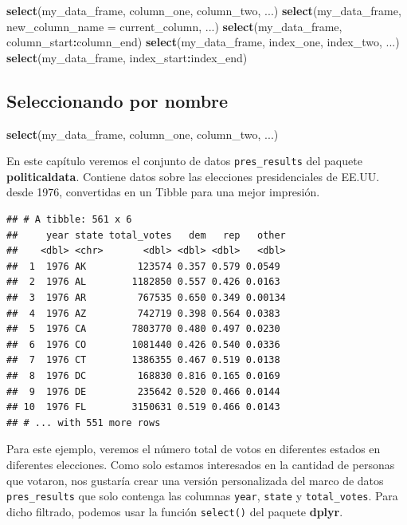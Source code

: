 \documentclass[
]{book}
\newenvironment{Shaded}{\begin{snugshade}}{\end{snugshade}}
\newcommand{\DataTypeTok}[1]{\textcolor[rgb]{0.13,0.29,0.53}{#1}}
\newcommand{\KeywordTok}[1]{\textcolor[rgb]{0.13,0.29,0.53}{\textbf{#1}}}
\newcommand{\NormalTok}[1]{#1}
\newcommand{\OperatorTok}[1]{\textcolor[rgb]{0.81,0.36,0.00}{\textbf{#1}}}
\begin{document}
\begin{Shaded}
\begin{Highlighting}[]
\KeywordTok{select}\NormalTok{(my_data_frame, column_one, column_two, ...)}
\KeywordTok{select}\NormalTok{(my_data_frame, }\DataTypeTok{new_column_name =}\NormalTok{ current_column, ...)}
\KeywordTok{select}\NormalTok{(my_data_frame, column_start}\OperatorTok{:}\NormalTok{column_end)}
\KeywordTok{select}\NormalTok{(my_data_frame, index_one, index_two, ...)}
\KeywordTok{select}\NormalTok{(my_data_frame, index_start}\OperatorTok{:}\NormalTok{index_end)}
\end{Highlighting}
\end{Shaded}

\hypertarget{seleccionando-por-nombre}{%
\subsection{Seleccionando por nombre}\label{seleccionando-por-nombre}}

\begin{Shaded}
\begin{Highlighting}[]
\KeywordTok{select}\NormalTok{(my_data_frame, column_one, column_two, ...)}
\end{Highlighting}
\end{Shaded}

En este capítulo veremos el conjunto de datos \texttt{pres\_results} del paquete \textbf{politicaldata}. Contiene datos sobre las elecciones presidenciales de EE.UU. desde 1976, convertidas en un Tibble para una mejor impresión.

\begin{verbatim}
## # A tibble: 561 x 6
##     year state total_votes   dem   rep   other
##    <dbl> <chr>       <dbl> <dbl> <dbl>   <dbl>
##  1  1976 AK         123574 0.357 0.579 0.0549 
##  2  1976 AL        1182850 0.557 0.426 0.0163 
##  3  1976 AR         767535 0.650 0.349 0.00134
##  4  1976 AZ         742719 0.398 0.564 0.0383 
##  5  1976 CA        7803770 0.480 0.497 0.0230 
##  6  1976 CO        1081440 0.426 0.540 0.0336 
##  7  1976 CT        1386355 0.467 0.519 0.0138 
##  8  1976 DC         168830 0.816 0.165 0.0169 
##  9  1976 DE         235642 0.520 0.466 0.0144 
## 10  1976 FL        3150631 0.519 0.466 0.0143 
## # ... with 551 more rows
\end{verbatim}

Para este ejemplo, veremos el número total de votos en diferentes estados en diferentes elecciones. Como solo estamos interesados en la cantidad de personas que votaron, nos gustaría crear una versión personalizada del marco de datos \texttt{pres\_results} que solo contenga las columnas \texttt{year}, \texttt{state} y \texttt{total\_votes}. Para dicho filtrado, podemos usar la función \texttt{select()} del paquete \textbf{dplyr}.
\end{document}
